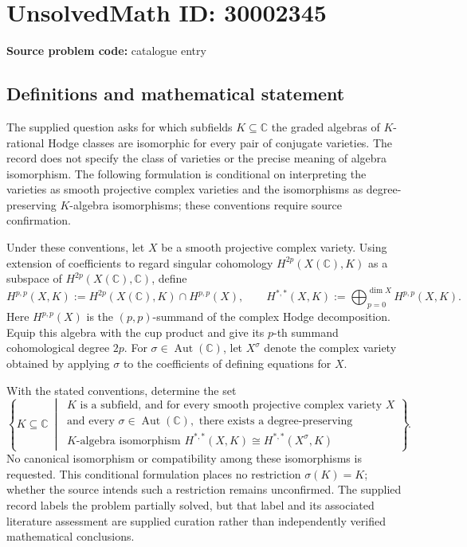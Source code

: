 \documentclass[11pt]{article}
\newcommand{\C}{\mathbb{C}}
\begin{document}
\section*{UnsolvedMath ID: 30002345}
\textbf{Source problem code:} catalogue entry
\subsection{Definitions and mathematical statement}
The supplied question asks for which subfields \(K\subseteq\C\) the graded algebras of \(K\)-rational Hodge classes are isomorphic for every pair of conjugate varieties. The record does not specify the class of varieties or the precise meaning of algebra isomorphism. The following formulation is conditional on interpreting the varieties as smooth projective complex varieties and the isomorphisms as degree-preserving \(K\)-algebra isomorphisms; these conventions require source confirmation.

Under these conventions, let \(X\) be a smooth projective complex variety. Using extension of coefficients to regard singular cohomology \(H^{2p}(X(\C),K)\) as a subspace of \(H^{2p}(X(\C),\C)\), define
\[
H^{p,p}(X,K):=H^{2p}(X(\C),K)\cap H^{p,p}(X),\qquad
H^{*,*}(X,K):=\bigoplus_{p=0}^{\dim X}H^{p,p}(X,K).
\]
Here \(H^{p,p}(X)\) is the \((p,p)\)-summand of the complex Hodge decomposition. Equip this algebra with the cup product and give its \(p\)-th summand cohomological degree \(2p\). For \(\sigma\in\operatorname{Aut}(\C)\), let \(X^\sigma\) denote the complex variety obtained by applying \(\sigma\) to the coefficients of defining equations for \(X\).

With the stated conventions, determine the set
\[
\left\{K\subseteq\C\ \middle|\ 
\begin{gathered}
K\text{ is a subfield, and for every smooth projective complex variety }X\\
\text{and every }\sigma\in\operatorname{Aut}(\C),\text{ there exists a degree-preserving}\\
K\text{-algebra isomorphism }H^{*,*}(X,K)\cong H^{*,*}(X^\sigma,K)
\end{gathered}
\right\}.
\]
No canonical isomorphism or compatibility among these isomorphisms is requested. This conditional formulation places no restriction \(\sigma(K)=K\); whether the source intends such a restriction remains unconfirmed. The supplied record labels the problem partially solved, but that label and its associated literature assessment are supplied curation rather than independently verified mathematical conclusions.
\end{document}
